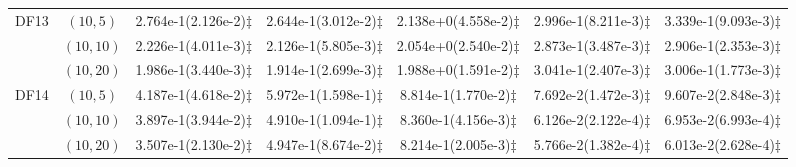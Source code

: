 \documentclass[review]{elsarticle}
\begin{document}
\begin{table*}[!htb]
{\begin{tabular}{ccccccc}
\hline  \multirow{3}{*}{DF13}
&$(10,5)$ &2.764e-1(2.126e-2)$\ddagger$ &2.644e-1(3.012e-2)$\ddagger$ &2.138e+0(4.558e-2)$\ddagger$ &2.996e-1(8.211e-3)$\ddagger$ &3.339e-1(9.093e-3)$\ddagger$ \\
&$(10,10)$ &2.226e-1(4.011e-3)$\ddagger$ &2.126e-1(5.805e-3)$\ddagger$ &2.054e+0(2.540e-2)$\ddagger$ &2.873e-1(3.487e-3)$\ddagger$ &2.906e-1(2.353e-3)$\ddagger$ \\
&$(10,20)$ &1.986e-1(3.440e-3)$\ddagger$ &1.914e-1(2.699e-3)$\ddagger$ &1.988e+0(1.591e-2)$\ddagger$ &3.041e-1(2.407e-3)$\ddagger$ &3.006e-1(1.773e-3)$\ddagger$ \\
\hline  \multirow{3}{*}{DF14}
&$(10,5)$ &4.187e-1(4.618e-2)$\ddagger$ &5.972e-1(1.598e-1)$\ddagger$ &8.814e-1(1.770e-2)$\ddagger$ &7.692e-2(1.472e-3)$\ddagger$ &9.607e-2(2.848e-3)$\ddagger$ \\
&$(10,10)$ &3.897e-1(3.944e-2)$\ddagger$ &4.910e-1(1.094e-1)$\ddagger$ &8.360e-1(4.156e-3)$\ddagger$ &6.126e-2(2.122e-4)$\ddagger$ &6.953e-2(6.993e-4)$\ddagger$ \\
&$(10,20)$ &3.507e-1(2.130e-2)$\ddagger$ &4.947e-1(8.674e-2)$\ddagger$ &8.214e-1(2.005e-3)$\ddagger$ &5.766e-2(1.382e-4)$\ddagger$ &6.013e-2(2.628e-4)$\ddagger$ \\
\hline
\end{tabular}}



\end{table*}
\end{document}
